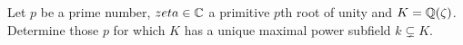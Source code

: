 \begin{problem}
  Let \(p\) be a prime number, \(zeta\in\mathbb{C}\) a primitive \(p\)th root of
  unity and \(K=\mathbb{Q}(\zeta)\). Determine those \(p\) for which \(K\) has a
  unique maximal power subfield \(k\subsetneq K\).
\end{problem}
\begin{solution}
\end{solution}


